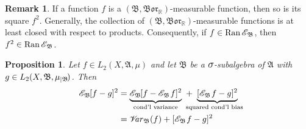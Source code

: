 \documentclass[
twoside=true,
paper=letter,
fontsize=11pt,
pagesize=auto,
leqno,
openany,
headsepline,
overfullrule,
]{scrbook}
\theoremstyle{plain}
\theoremstyle{plain}
\newtheorem{prop}[thm]{Proposition}
\theoremstyle{definition}
\newtheorem{rmk}[thm]{Remark}
\theoremstyle{bfnoteitalic}
\theoremstyle{bfnoteroman}
\newcommand{\sigalg}[1]{\mathfrak{#1}}
\newcommand{\cali}[1]{\mathscr{#1}}
\DeclareMathOperator{\range}{Ran}
\newcommand{\condexpsub}[2]
{\mathop{\cali{E}\hspace{-1.5pt}}\nolimits_{#2}\hspace{-1pt}#1}
\newcommand{\condexpop}[1]{\mathop{\cali{E}\hspace{-1pt}}\nolimits_{#1}}
\newcommand{\condvarsub}[2]
{\mathop{\cali{V}\hspace{-3pt}\mathit{ar}}\nolimits_{#2}(#1)}
\newcommand{\borel}{\mathfrak{Bor}}
\newcommand{\textsigma}{\hbox{\large{$\sigma$}}\kern-1pt}
\newcommand{\restrictedto}[1]{_{\lvert#1}\kern-1.5pt}
\newcommand{\R}{\mathbb{R}}
\newcommand{\sigmaalgebra}{\sigalg{A}}
\newcommand{\sigmaalgebraii}{\sigalg{B}}
\newcommand{\Ltwo}{L_2(\measurespace, \sigmaalgebra, \measure)}
\newcommand{\sigalgb}{\sigmaalgebraii}
\newcommand{\function}{f}
\newcommand{\functionii}{g}
\newcommand{\measurespace}{X}
\newcommand{\measure}{\mu}
\begin{document}
\begin{rmk}
If a function $\function$ is a $(\sigalgb,\borel_\R)$\hyp{}measurable function, then so is its square $\function^2$.  Generally, the collection of $(\sigalgb,\borel_\R)$\hyp{}measurable functions is at least closed with respect to products.  Consequently, if 
$\function\in\range\condexpop{\sigalgb}$, then 
$\function^2\in\range\condexpop{\sigalgb}$.
\end{rmk}




\begin{prop}\label{conditional_bias_variance}
Let $\function\in\Ltwo$ and let $\sigmaalgebraii$ be a $\textsigma$-subalgebra of $\sigmaalgebra$ with
$\functionii\in L_2(\measurespace, \sigmaalgebraii,\measure\restrictedto{\sigmaalgebraii})$. Then
\begin{align*}
\condexpsub{[\function-\functionii]^2}{\sigmaalgebraii} 
&=
\underbrace{\condexpsub{[\function-\condexpsub{\function}{\sigmaalgebraii}]^2}{\sigmaalgebraii}}_{\text{cond'l variance}} 
\ +
\ \underbrace{[\condexpsub{\function}{\sigmaalgebraii}-\functionii]^2}
_{\llap{$\scriptstyle\text{squared cond'l bias}$}}\\
&=\condvarsub{\function}{\sigmaalgebraii} + [\condexpsub{\function}{\sigmaalgebraii}-\functionii]^2
\end{align*}
\end{prop}
\end{document}

